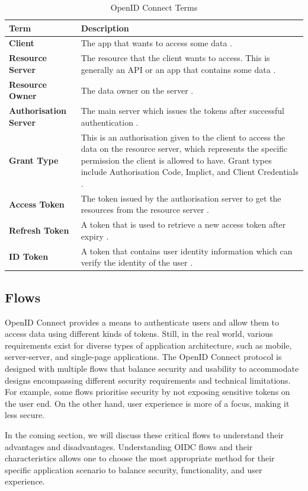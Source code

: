 \begin{longtable}{|p{4cm}|p{10cm}|}
\caption{OpenID Connect Terms}
    \label{table:oauth_terms}
\hline
\rowcolor{grey!15}
\textbf{Term} & \textbf{Description} \\ 
\hline

\textbf{Client} & The app that wants to access some data \citep{oidc_tokens}. \\ \hline
\textbf{Resource Server} & The resource that the client wants to access. This is generally an API or an app that contains some data \citep{oidc_tokens}. \\ \hline
\textbf{Resource Owner} & The data owner on the server \citep{oidc_tokens}. \\ \hline
\textbf{Authorisation Server} & The main server which issues the tokens after successful authentication \citep{oidc_tokens}.\\ \hline
\textbf{Grant Type} & This is an authorisation given to the client to access the data on the resource server, which represents the specific permission the client is allowed to have. Grant types include Authorisation Code, Implict, and Client Credentials \citep{adv_api_sec}.  \\ \hline
\textbf{Access Token} & The token issued by the authorisation server to get the resources from the resource server \citep{oidc_tokens}. \\ \hline
\textbf{Refresh Token} & A token that is used to retrieve a new access token after expiry \citep{oidc_tokens}. \\ \hline
\textbf{ID Token} & A token that contains user identity information which can verify the identity of the user \citep{oidc_tokens}. \\ \hline
\end{longtable}
\endgroup

\subsection{Flows}
OpenID Connect provides a means to authenticate users and allow them to access data using different kinds of tokens. Still, in the real world, various requirements exist for diverse types of application architecture, such as mobile, server-server, and single-page applications. The OpenID Connect protocol is designed with multiple flows that balance security and usability to accommodate designs encompassing different security requirements and technical limitations. For example, some flows prioritise security by not exposing sensitive tokens on the user end. On the other hand, user experience is more of a focus, making it less secure. 
\par
In the coming section, we will discuss these critical flows to understand their advantages and disadvantages. Understanding OIDC flows and their characteristics allows one to choose the most appropriate method for their specific application scenario to balance security, functionality, and user experience.



